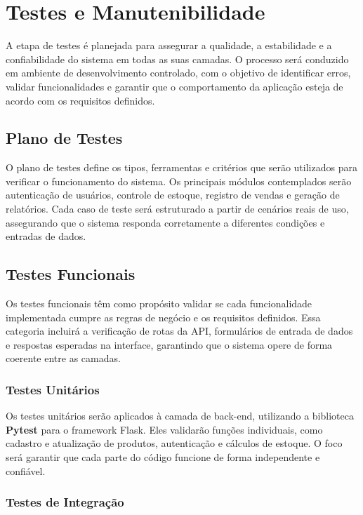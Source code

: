 \section{Testes e Manutenibilidade}

A etapa de testes é planejada para assegurar a qualidade, a estabilidade e a confiabilidade do sistema em todas as suas camadas. O processo será conduzido em ambiente de desenvolvimento controlado, com o objetivo de identificar erros, validar funcionalidades e garantir que o comportamento da aplicação esteja de acordo com os requisitos definidos.

\subsection{Plano de Testes}

O plano de testes define os tipos, ferramentas e critérios que serão utilizados para verificar o funcionamento do sistema. Os principais módulos contemplados serão autenticação de usuários, controle de estoque, registro de vendas e geração de relatórios. Cada caso de teste será estruturado a partir de cenários reais de uso, assegurando que o sistema responda corretamente a diferentes condições e entradas de dados.

\subsection{Testes Funcionais}

Os testes funcionais têm como propósito validar se cada funcionalidade implementada cumpre as regras de negócio e os requisitos definidos. Essa categoria incluirá a verificação de rotas da API, formulários de entrada de dados e respostas esperadas na interface, garantindo que o sistema opere de forma coerente entre as camadas.

\subsubsection{Testes Unitários}

Os testes unitários serão aplicados à camada de back-end, utilizando a biblioteca \textbf{Pytest} para o framework Flask. Eles validarão funções individuais, como cadastro e atualização de produtos, autenticação e cálculos de estoque. O foco será garantir que cada parte do código funcione de forma independente e confiável.

\subsubsection{Testes de Integração}

